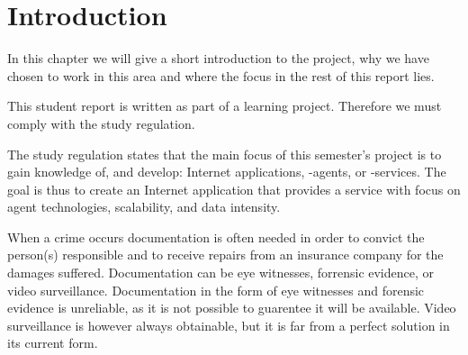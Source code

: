 \chapter{Introduction}
In this chapter we will give a short introduction to the project, why we have chosen to work in this area and where the focus in the rest of this report lies.

This student report is written as part of a learning project. Therefore we must comply with the study regulation.

The study regulation states that the main focus of this semester's project is to gain knowledge of, and develop: Internet applications, -agents, or -services.
The goal is thus to create an Internet application that provides a service with focus on agent technologies, scalability, and data intensity.

When a crime occurs documentation is often needed in order to convict the person(s) responsible and to receive repairs from an insurance company for the damages suffered.
Documentation can be eye witnesses, forrensic evidence, or video surveillance.
Documentation in the form of eye witnesses and forensic evidence is unreliable, as it is not possible to guarentee it will be available.
Video surveillance is however always obtainable, but it is far from a perfect solution in its current form.





